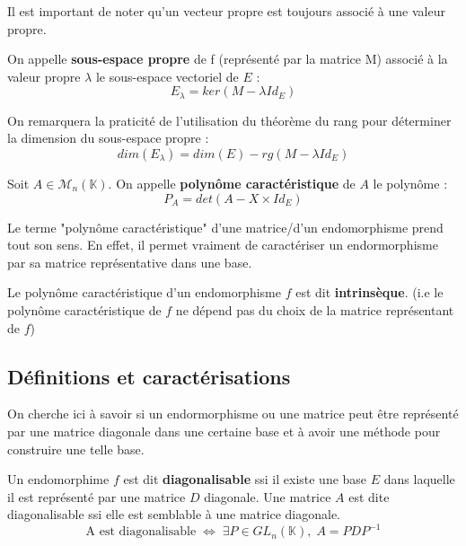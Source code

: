 Il est important de noter qu'un vecteur propre est toujours associé à une valeur propre. 

\begin{definition}
    On appelle \textbf{sous-espace propre} de f (représenté par la matrice M) associé à la valeur propre $\lambda$ le sous-espace vectoriel de $E$ : 
    \[ \boxed{E_\lambda = ker(M - \lambda Id_E)} \]
\end{definition}

On remarquera la praticité de l'utilisation du théorème du rang pour déterminer la dimension du sous-espace propre : \[ dim(E_\lambda) = dim(E) - rg(M - \lambda Id_E) \]

\begin{definition}
    Soit $A \in \mathcal{M}_n(\mathbb{K}) $. On appelle \textbf{polynôme caractéristique} de $A$ le polynôme : 
    \[ P_A = det(A - X \times Id_E) \]
\end{definition}

Le terme "polynôme caractéristique" d'une matrice/d'un endomorphisme prend tout son sens. 
En effet, il permet vraiment de caractériser un endormorphisme par sa matrice représentative dans une base. 

\begin{remark}
    Le polynôme caractéristique d'un endomorphisme $f$ est dit \textbf{intrinsèque}.
    (i.e le polynôme caractéristique de $f$ ne dépend pas du choix de la matrice représentant de $f$)
\end{remark}

\subsection{Définitions et caractérisations}

On cherche ici à savoir si un endormorphisme ou une matrice peut être représenté par une matrice diagonale dans une certaine base 
et à avoir une méthode pour construire une telle base. 

\begin{definition}
    Un endomorphime $f$ est dit \textbf{diagonalisable} ssi il existe une base $E$ dans laquelle il est représenté par une matrice $D$ diagonale. 
    Une matrice $A$ est dite diagonalisable ssi elle est semblable à une matrice diagonale. 
    \[ \boxed{ \text{A est diagonalisable} \; \Leftrightarrow \; \exists P \in GL_n(\mathbb{K}), \; A = PDP^{-1} } \]
\end{definition}

